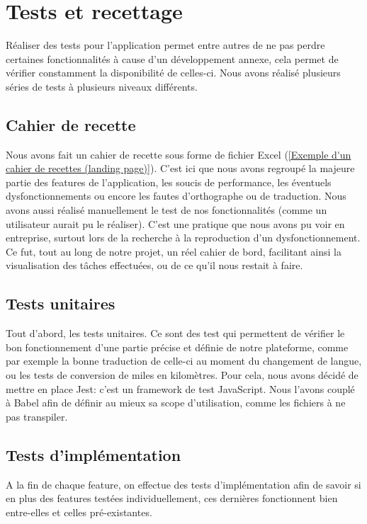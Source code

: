 \section{Tests et recettage}
Réaliser des tests pour l'application permet entre autres de ne pas perdre certaines fonctionnalités à cause d'un développement annexe, cela permet de vérifier constamment la disponibilité de celles-ci. Nous avons réalisé plusieurs séries de tests à plusieurs niveaux différents.  

\subsection{Cahier de recette}

Nous avons fait un cahier de recette sous forme de fichier Excel (\ref{Exemple d'un cahier de recettes (landing page)}). C'est ici que nous avons regroupé la majeure partie des features de l'application, les soucis de performance, les éventuels dysfonctionnements ou encore les fautes d'orthographe ou de traduction. Nous avons aussi réalisé manuellement le test de nos fonctionnalités (comme un utilisateur aurait pu le réaliser). C'est une pratique que nous avons pu voir en entreprise, surtout lors de la recherche à la reproduction d'un dysfonctionnement. Ce fut, tout au long de notre projet, un réel cahier de bord, facilitant ainsi la visualisation des tâches effectuées, ou de ce qu'il nous restait à faire.

\subsection{Tests unitaires}

Tout d'abord, les tests unitaires. Ce sont des test qui permettent de vérifier le bon fonctionnement d'une partie précise et définie de notre plateforme, comme par exemple la bonne traduction de celle-ci au moment du changement de langue, ou les tests de conversion de miles en kilomètres. Pour cela, nous avons décidé de mettre en place Jest: c'est un framework de test JavaScript. Nous l'avons couplé à Babel afin de définir au mieux sa scope d'utilisation, comme les fichiers à ne pas transpiler.

\subsection{Tests d'implémentation}

A la fin de chaque feature, on effectue des tests d'implémentation afin de savoir si en plus des features testées individuellement, ces dernières fonctionnent bien entre-elles et celles pré-existantes.

